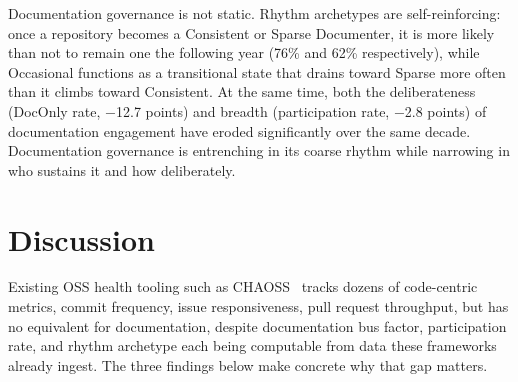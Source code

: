 \documentclass[10pt,conference]{IEEEtran}
\begin{document}
{{\begin{tcolorbox}[
  colback=heatmaplight,
  colframe=heatmapdark,
  coltitle=white,
  fonttitle=\bfseries,
  title=Summary --- RQ4
]
Documentation governance is not static. Rhythm archetypes are self-reinforcing: once a repository becomes a Consistent or Sparse Documenter, it is more likely than not to remain one the following year (76\% and 62\% respectively), while Occasional functions as a transitional state that drains toward Sparse more often than it climbs toward Consistent. At the same time, both the deliberateness (DocOnly rate, $-$12.7 points) and breadth (participation rate, $-$2.8 points) of documentation engagement have eroded significantly over the same decade. Documentation governance is entrenching in its coarse rhythm while narrowing in who sustains it and how deliberately.
\end{tcolorbox}

\section{Discussion}
\label{sec:Discussion}

Existing OSS health tooling such as CHAOSS~\cite{chaoss} tracks dozens of code-centric metrics, commit frequency, issue responsiveness, pull request throughput, but has no equivalent for documentation, despite documentation bus factor, participation rate, and rhythm archetype each being computable from data these frameworks already ingest. The three findings below make concrete why that gap matters.

}}
\end{document}
